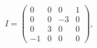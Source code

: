 \begin{equation}
 I = \left( \begin {array}{cccc} 0&0&0&1\\ 0&0&-3&0\\0&3&0&0
\\-1&0&0&0\end {array} \right),
\end{equation}

